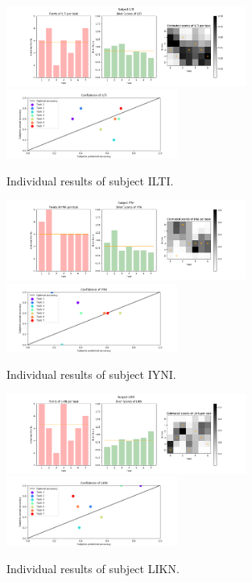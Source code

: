 \documentclass[../main/main.tex]{subfiles}
\begin{document}
	\begin{figure}[H]
		\centering
		\captionsetup{justification=centering}
		\includegraphics[width=0.7\textwidth]{../assets/ILTI_results.png}
		\includegraphics[width=0.5\textwidth]{../assets/ILTI_confidence.png}
		\caption{Individual results of subject ILTI.} 
		\label{fig:ILTI}
	\end{figure}
	\begin{figure}[H]
		\centering
		\captionsetup{justification=centering}
		\includegraphics[width=0.7\textwidth]{../assets/IYNI_results.png}
		\includegraphics[width=0.5\textwidth]{../assets/IYNI_confidence.png}
		\caption{Individual results of subject IYNI.} 
		\label{fig:IYNI}
	\end{figure}
	\begin{figure}[H]
		\centering
		\captionsetup{justification=centering}
		\includegraphics[width=0.7\textwidth]{../assets/LIKN_results.png}
		\includegraphics[width=0.5\textwidth]{../assets/LIKN_confidence.png}
		\caption{Individual results of subject LIKN.} 
		\label{fig:LIKN}
	\end{figure}
\end{document}
